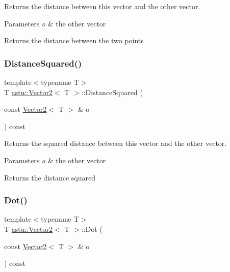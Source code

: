 Returns the distance between this vector and the other vector.


\begin{DoxyParams}{Parameters}
{\em o} & the other vector \\
\hline
\end{DoxyParams}
\begin{DoxyReturn}{Returns}
the distance between the two points 
\end{DoxyReturn}
\mbox{\label{classastu_1_1Vector2_ac60cbccfefd62216f648c388c5025649}} 
\subsubsection{\texorpdfstring{Distance\+Squared()}{DistanceSquared()}}
{\footnotesize\ttfamily template$<$typename T$>$ \\
T \hyperlink{classastu_1_1Vector2}{astu\+::\+Vector2}$<$ T $>$\+::Distance\+Squared (\begin{DoxyParamCaption}\item[{const \hyperlink{classastu_1_1Vector2}{Vector2}$<$ T $>$ \&}]{o }\end{DoxyParamCaption}) const\hspace{0.3cm}{\ttfamily [inline]}}

Returns the squared distance between this vector and the other vector.


\begin{DoxyParams}{Parameters}
{\em o} & the other vector \\
\hline
\end{DoxyParams}
\begin{DoxyReturn}{Returns}
the distance squared 
\end{DoxyReturn}
\mbox{\label{classastu_1_1Vector2_a44f449c9f23b8e5aa2739c3a50b57ceb}} 
\subsubsection{\texorpdfstring{Dot()}{Dot()}\hspace{0.1cm}{\footnotesize\ttfamily [1/2]}}
{\footnotesize\ttfamily template$<$typename T$>$ \\
T \hyperlink{classastu_1_1Vector2}{astu\+::\+Vector2}$<$ T $>$\+::Dot (\begin{DoxyParamCaption}\item[{const \hyperlink{classastu_1_1Vector2}{Vector2}$<$ T $>$ \&}]{o }\end{DoxyParamCaption}) const\hspace{0.3cm}{\ttfamily [inline]}}

